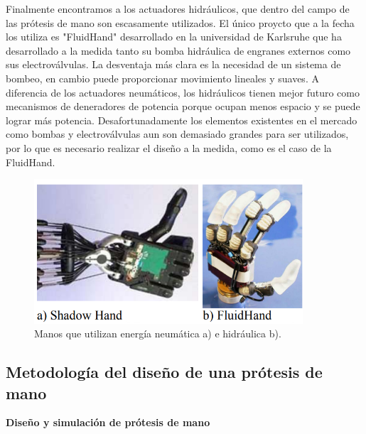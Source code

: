 \documentclass{article}
\begin{document}
Finalmente encontramos a los actuadores hidráulicos, que dentro del campo de las prótesis de mano son escasamente utilizados. El único proycto que a la fecha los utiliza es "FluidHand" desarrollado en la universidad de Karlsruhe que ha desarrollado a la medida tanto su bomba hidráulica de engranes externos como sus electroválvulas. La desventaja más clara  es la necesidad de un sistema de bombeo, en cambio puede proporcionar movimiento lineales y suaves. A diferencia de los actuadores neumáticos, los hidráulicos tienen mejor futuro como mecanismos de deneradores de potencia porque ocupan menos espacio y se puede lograr más potencia. Desafortunadamente los elementos existentes en el mercado como bombas y electroválvulas aun son demasiado grandes para ser utilizados, por lo que es necesario realizar el diseño a la medida, como es el caso de la FluidHand\cite{ff2}.  

\begin{figure}[H] %
    \centering
    \includegraphics[width=100mm]{protesis 4.png} %
    \caption{Manos que utilizan energía neumática a) e hidráulica b)\cite{ff2}.}
    \label{grafica:siete}
\end{figure}

\subsection{Metodología del diseño de una prótesis de mano}

\textbf{Diseño y simulación de prótesis de mano} 
\end{document}
